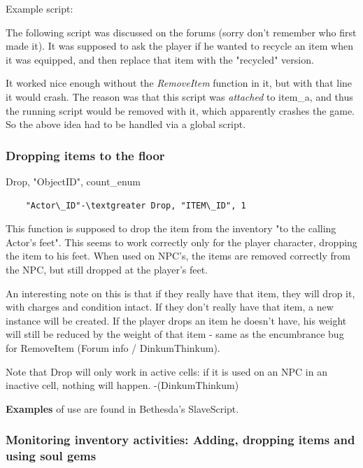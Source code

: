 Example script:

The following script was discussed on the forums (sorry don't remember
who first made it). It was supposed to ask the player if he wanted to
recycle an item when it was equipped, and then replace that item with
the "recycled" version.



It worked nice enough without the \emph{RemoveItem} function in it, but
with that line it would crash. The reason was that this script was
\emph{attached} to item\_a, and thus the running script would be removed
with it, which apparently crashes the game. So the above idea had to be
handled via a global script.

\hypertarget{dropping-items-to-the-floor}{%
\subsubsection{Dropping items to the
floor}\label{dropping-items-to-the-floor}}

	Drop, "ObjectID", count\_enum

\begin{lstlisting}	
	"Actor\_ID"-\textgreater Drop, "ITEM\_ID", 1
\end{lstlisting}

This function is supposed to drop the item from the inventory "to the
calling Actor's feet". This seems to work correctly only for the player
character, dropping the item to his feet. When used on NPC's, the items
are removed correctly from the NPC, but still dropped at the player's
feet.

An interesting note on this is that if they really have that item, they
will drop it, with charges and condition intact. If they don't really
have that item, a new instance will be created. If the player drops an
item he doesn't have, his weight will still be reduced by the weight of
that item - same as the encumbrance bug for RemoveItem (Forum info /
DinkumThinkum).

Note that Drop will only work in active cells: if it is used on an NPC
in an inactive cell, nothing will happen. -(DinkumThinkum)

\textbf{Examples} of use are found in Bethesda's SlaveScript.

\hypertarget{monitoring-inventory-activities-adding-dropping-items-and-using-soul-gems}{%
\subsubsection{Monitoring inventory activities: Adding, dropping items
and using soul
gems}\label{monitoring-inventory-activities-adding-dropping-items-and-using-soul-gems}}

